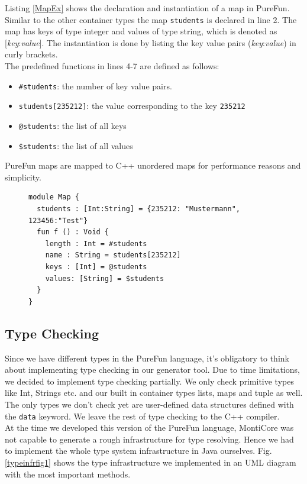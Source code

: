 Listing \ref{MapEx} shows the declaration and instantiation of a map in PureFun. Similar to the other container types the map \texttt{students} is declared in line 2. The map has keys of type integer and values of type string, which is denoted as [\textit{key}:\textit{value}]. The instantiation is done by listing the key value pairs (\textit{key}:\textit{value}) in curly brackets.\\
The predefined functions in lines 4-7 are defined as follows:
\begin{itemize}
\item \texttt{\#students}: the number of key value pairs.
\item \texttt{students[235212]}: the value corresponding to the key \texttt{235212}
\item \texttt{@students}: the list of all keys
\item \texttt{\$students}: the list of all values
\end{itemize}
PureFun maps are mapped to C++ unordered maps for performance reasons and simplicity.
\begin{figure}
\begin{lstlisting}[caption={PureFun code with a map and its predefined functions.},label={MapEx}]
module Map {
  students : [Int:String] = {235212: "Mustermann", 123456:"Test"}
  fun f () : Void {
    length : Int = #students
    name : String = students[235212]
    keys : [Int] = @students
    values: [String] = $students
  }
}
\end{lstlisting}
\end{figure}
\subsection{Type Checking}

Since we have different types in the PureFun language, it's obligatory to think about implementing type checking in our generator tool. Due to time limitations, we decided to implement type checking partially. We only check primitive types like Int, Strings etc. and our built in container types lists, maps and tuple as well. The only types we don't check yet are user-defined data structures defined with the \texttt{data} keyword. We leave the rest of type checking to the C++ compiler.\\
At the time we developed this version of the PureFun language, MontiCore was not capable to generate a rough infrastructure for type resolving. Hence we had to implement the whole type system infrastructure in Java ourselves. Fig. \ref{typeinfrfig1} shows the type infrastructure we implemented in an UML diagram with the most important methods.

